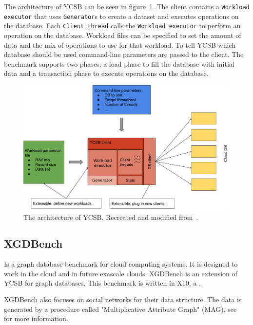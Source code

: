 The architecture of YCSB can be seen in figure~\ref{fig:ycsbArchitecture}.
The client contains a \texttt{Workload executor} that uses \texttt{Generator}s to create a dataset and executes operations on the database.
Each \texttt{Client thread} calls the \texttt{Workload executor} to perform an operation on the database.
Workload files can be specified to set the amount of data and the mix of operations to use for that workload.
To tell YCSB which database should be used command-line parameters are passed to the client.
The benchmark supports two phases,
a load phase to fill the database with initial data and a transaction phase to execute operations on the database.

\begin{figure}[h!]
  \centering
  \includegraphics[width=\textwidth]{images/benchmarks/ycsbArchitecture}
  \caption{The architecture of YCSB. Recreated and modified from~\cite[25]{Abubakar2014}.}
  \label{fig:ycsbArchitecture}
\end{figure}

\subsection{XGDBench}
\label{ch:background:se:XGDBench}
Is a graph database benchmark for cloud computing systems.
It is designed to work in the cloud and in future exascale clouds.
XGDBench is an extension of YCSB for graph databases.
This benchmark is written in X10,
a .

XGDBench also focuses on social networks for their data structure.
The data is generated by a procedure called "Multiplicative Attribute Graph" (MAG),
see~\cite{Kim2012} for more information.

